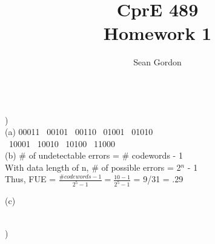 \documentclass[12pt]{article}
\title{CprE 489\\Homework 1}
\author{Sean Gordon}
\begin{document}
\maketitle


\hrulefill \\


)\\
\indent (a) 00011 \ 00101 \ 00110 \ 01001 \ 01010 \\
\indent {} \ 10001 \ 10010 \ 10100 \ 11000\\

(b) \# of undetectable errors = \# codewords - 1\\
\indent \indent With data length of n, \# of possible errors = 2$^n$ - 1\\
\indent \indent Thus, FUE = {\Large$\frac{\#codewords - 1}{2^5 - 1} = \frac{10 - 1}{2^5 - 1}$} = 9/31 = .29\\

\indent \indent 

\indent (c) \\
\indent \indent 

\hrulefill \\


)\\
\end{document}
